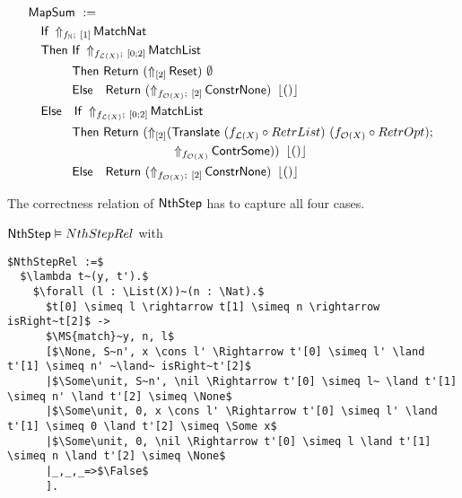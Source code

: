 \begin{definition}
  \label{def:Nth_Step}
  ~
  \begin{align*}
    & \MS{MapSum}~:= \\
    &\quad \MS{If}~\LiftBoth{\MS{MatchNat}}{f_\Nat}{\Vector{1}} \\
    &\quad \MS{Then}~ \MS{If}~\LiftBoth{\MS{MatchList}}{f_{\List(X)}}{\Vector{0;2}} \\
    &\quad \phantom{\MS{Then}}~\MS{Then}~   \Return{(\LiftTapes{\MS{Reset}}{\Vector{2}})}{\None} \\
    &\quad \phantom{\MS{Then}}~\MS{Else}~~~ \Return{(\LiftBoth{\MS{ConstrNone}}{f_{\Option(X)}}{\Vector{2}})}{\Some\unit} \\
    &\quad \MS{Else}~~~ \MS{If}~\LiftBoth{\MS{MatchList}}{f_{\List(X)}}{\Vector{0;2}} \\
    &\quad \phantom{\MS{Then}}~\MS{Then}~   \Return{(\LiftTapes{(\MS{Translate}~(f_{\List(X)} \circ RetrList)~(f_{\Option(X)} \circ RetrOpt) \Seq \\
    &\quad \phantom{\phantom{\MS{Then}}~\MS{Then}~\MS{Return}}\quad\quad~~ \LiftAlphabet{\MS{ContrSome}}{f_{\Option(X)}})}{\Vector{2}})}{\Some\unit} \\
    &\quad \phantom{\MS{Then}}~\MS{Else}~~~ \Return{(\LiftBoth{\MS{ConstrNone}}{f_{\Option(X)}}{\Vector{2}})}{\Some\unit}
  \end{align*}
\end{definition}

The correctness relation of $\mathsf{NthStep}$ has to capture all four cases.

\begin{lemma}
  \label{lem:Nth_Step_Realise}
  $\mathsf{NthStep} \mathrel{\vDash} NthStepRel$ with
  \small
\begin{lstlisting}[style=semicoqstyle]
$NthStepRel :=$
  $\lambda t~(y, t').$
    $\forall (l : \List(X))~(n : \Nat).$
      $t[0] \simeq l \rightarrow t[1] \simeq n \rightarrow isRight~t[2]$ ->
      $\MS{match}~y, n, l$
      [$\None, S~n', x \cons l' \Rightarrow t'[0] \simeq l' \land t'[1] \simeq n' ~\land~ isRight~t'[2]$
      |$\Some\unit, S~n', \nil \Rightarrow t'[0] \simeq l~ \land t'[1] \simeq n' \land t'[2] \simeq \None$
      |$\Some\unit, 0, x \cons l' \Rightarrow t'[0] \simeq l' \land t'[1] \simeq 0 \land t'[2] \simeq \Some x$
      |$\Some\unit, 0, \nil \Rightarrow t'[0] \simeq l \land t'[1] \simeq n \land t'[2] \simeq \None$
      |_,_,_=>$\False$
      ].
\end{lstlisting}
\end{lemma}

